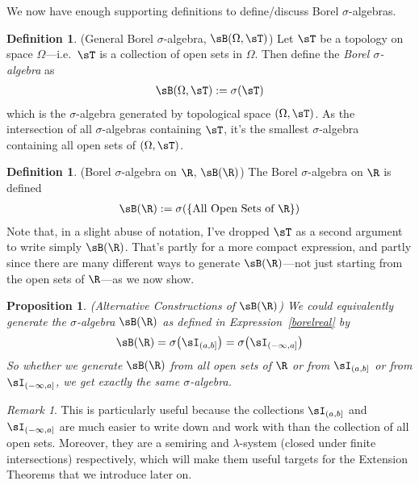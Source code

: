 \documentclass[12pt]{article}
\theoremstyle{plain}
\newtheorem{prop}[thm]{Proposition}
\theoremstyle{definition}
\newtheorem{defn}[thm]{Definition}
\theoremstyle{remark}
\newtheorem*{rmk}{Remark}
\begin{document}
\clearpage

We now have enough supporting definitions to define/discuss Borel
$\sigma$-algebras.

\begin{defn}(General Borel $\sigma$-algebra, $\sB(\Omega,\sT)$)
\label{defn:borel-general}
Let $\sT$ be a topology on space $\Omega$---i.e.\ $\sT$ is a collection
of open sets in $\Omega$. Then define the \emph{Borel $\sigma$-algebra}
as
\begin{align*}
  \sB(\Omega,\sT):=\sigma(\sT)
\end{align*}
which is the $\sigma$-algebra generated by topological space
$(\Omega,\sT)$.
As the intersection of all $\sigma$-algebras containing $\sT$, it's the
smallest $\sigma$-algebra containing all open sets of $(\Omega,\sT)$.
\end{defn}


\begin{defn}(Borel $\sigma$-algebra on $\R$, $\sB(\R)$)
The Borel $\sigma$-algebra on $\R$ is defined
\begin{align}
  \sB(\R) :=
  \sigma(\{\text{All Open Sets of $\R$}\})
  \label{borelreal}
\end{align}
Note that, in a slight abuse of notation,
I've dropped $\sT$ as a second argument to write simply $\sB(\R)$.
That's partly for a more compact expression, and partly since there are
many different ways to generate $\sB(\R)$---not just starting from the
open sets of $\R$---as we now show.
\end{defn}

\begin{prop}\emph{(Alternative Constructions of $\sB(\R)$)}
\label{prop:borelalt}
We could equivalently generate the $\sigma$-algebra $\sB(\R)$ as defined
in Expression~\ref{borelreal} by
\begin{align}
  \sB(\R) =
  \sigma\big(\sI_{(a,b]}\big)
  = \sigma\big(\sI_{(-\infty,a]}\big)
  \label{borelalt}
\end{align}
So whether we generate $\sB(\R)$ from all open sets of $\R$ or
from $\sI_{(a,b]}$ or from $\sI_{(-\infty,a]}$, we get
exactly the same $\sigma$-algebra.
\end{prop}

\begin{rmk}
This is particularly useful because the collections $\sI_{(a,b]}$ and
$\sI_{(-\infty,a]}$ are much easier to write down and work with than the
collection of all open sets.
Moreover, they are a semiring and $\lambda$-system (closed under finite
intersections) respectively, which will make them useful targets for the
Extension Theorems that we introduce later on.
\end{rmk}
\end{document}
